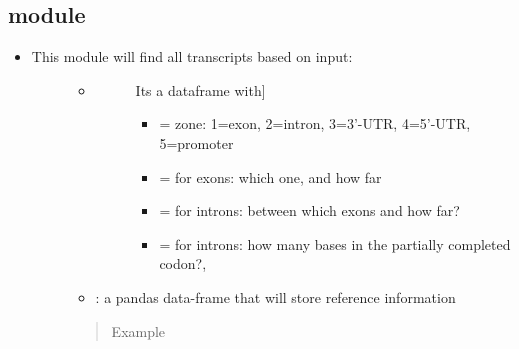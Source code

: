 \documentclass[letterpaper,10pt,english]{sphinxmanual}
\begin{document}
\subsection{ module}
\label{\detokenize{iAnnotateSV:findalltranscripts-module}}\begin{itemize}
\item {} \begin{description}
\item[{This module will find all transcripts based on input:}] \leavevmode\begin{itemize}
\item {} \begin{description}
\item[{}] \leavevmode{[}Its a dataframe with{]}\begin{itemize}
\item {} 
 = zone: 1=exon, 2=intron, 3=3’-UTR, 4=5’-UTR, 5=promoter

\item {} 
 = for exons: which one, and how far

\item {} 
 = for introns: between which exons and how far?

\item {} 
 = for introns: how many bases in the partially completed codon?,

\end{itemize}

\end{description}

\item {} 
 : a pandas data-frame that will store reference information

\end{itemize}
\begin{quote}\begin{description}
\item[{Example}] \leavevmode
{}

\end{description}\end{quote}

\end{description}

\end{itemize}
\end{document}
